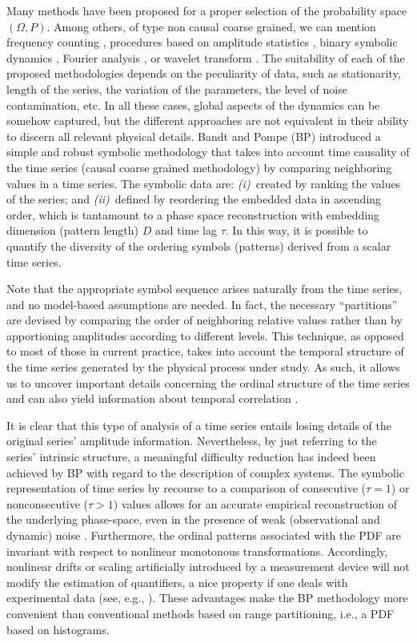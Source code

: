 Many methods have been proposed for a proper selection of the probability space $(\Omega, P)$. 
Among others, of type non causal coarse grained, we can mention frequency counting \cite{Rosso2009C}, 
procedures based on amplitude statistics \cite{DeMicco2008}, binary symbolic dynamics \cite{Mischaikow1999},
Fourier analysis \cite{Powell1979}, or wavelet transform \cite{Rosso2001}. 
The suitability of each of the proposed methodologies depends on the peculiarity of data, such as stationarity, 
length of the series, the variation of the parameters, the level of noise contamination, etc. 
In all these cases, global aspects of the dynamics can be somehow captured, but the different approaches 
are not equivalent in their ability to discern all relevant physical details.
Bandt and Pompe (BP)\cite{Bandt2002} introduced a simple and robust symbolic methodology that takes into account 
time causality of the time series (causal coarse grained methodology) by comparing neighboring values in a 
time series.
The symbolic data are:
{\it (i)\/}~created by ranking the values of the series; and
{\it (ii)\/}~defined by reordering the embedded data in ascending order, which is tantamount to a phase space 
reconstruction with embedding dimension (pattern length) $D$ and time lag $\tau$.
In this way, it is possible to quantify the diversity of the ordering symbols (patterns) derived from a scalar 
time series.

Note that the appropriate symbol sequence arises naturally from the time series, and no model-based assumptions 
are needed.
In fact, the necessary ``partitions'' are devised by comparing the order of neighboring relative values rather 
than by apportioning amplitudes according to different levels.
This technique, as opposed to most of those in current practice, takes into account the temporal structure of 
the time series generated by the physical process under study.
As such, it allows us to uncover important details concerning the ordinal structure of the time series
\cite{Rosso2007,Rosso2012A,Rosso2012B,Rosso2013} and can also yield information about temporal correlation 
\cite{Rosso2009A,Rosso2009B}.

It is clear that this type of analysis of a time series entails losing details of the original series' 
amplitude information.
Nevertheless, by just referring to the series' intrinsic structure, a meaningful difficulty reduction has 
indeed been achieved by BP with regard to the description of complex systems.
The symbolic representation of time series by recourse to a comparison of consecutive ($\tau = 1$) or 
nonconsecutive ($\tau > 1$) values allows for an accurate empirical reconstruction of the underlying phase-space, 
even in the presence of weak (observational and dynamic) noise \cite{Bandt2002}.
Furthermore, the ordinal patterns associated with the PDF are invariant with respect to nonlinear monotonous 
transformations.
Accordingly, nonlinear drifts or scaling artificially introduced by a measurement device will not modify the 
estimation of quantifiers, a nice property if one deals with experimental data (see, e.g., \cite{Saco2010}).
These advantages make the BP methodology more convenient than conventional methods based on range 
partitioning, i.e., a PDF based on histograms.


